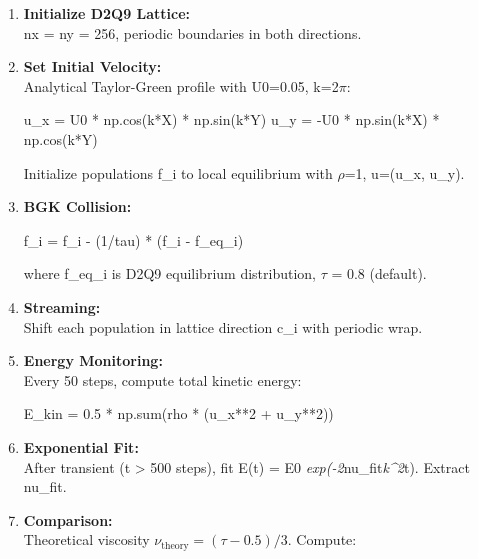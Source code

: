 \documentclass[
]{article}
\newenvironment{Shaded}{}{}
\newcommand{\BuiltInTok}[1]{\textcolor[rgb]{0.00,0.50,0.00}{#1}}
\newcommand{\DecValTok}[1]{\textcolor[rgb]{0.25,0.63,0.44}{#1}}
\newcommand{\FloatTok}[1]{\textcolor[rgb]{0.25,0.63,0.44}{#1}}
\newcommand{\NormalTok}[1]{#1}
\newcommand{\OperatorTok}[1]{\textcolor[rgb]{0.40,0.40,0.40}{#1}}
\begin{document}
\begin{enumerate}
\def\labelenumi{\arabic{enumi}.}
\item
  \textbf{Initialize D2Q9 Lattice:}\\
  nx = ny = 256, periodic boundaries in both directions.
\item
  \textbf{Set Initial Velocity:}\\
  Analytical Taylor-Green profile with U0=0.05, k=2$\pi$:

\begin{Shaded}
\begin{Highlighting}[]
\NormalTok{u\_x }\OperatorTok{=}\NormalTok{ U0 }\OperatorTok{*}\NormalTok{ np.cos(k}\OperatorTok{*}\NormalTok{X) }\OperatorTok{*}\NormalTok{ np.sin(k}\OperatorTok{*}\NormalTok{Y)}
\NormalTok{u\_y }\OperatorTok{=} \OperatorTok{{-}}\NormalTok{U0 }\OperatorTok{*}\NormalTok{ np.sin(k}\OperatorTok{*}\NormalTok{X) }\OperatorTok{*}\NormalTok{ np.cos(k}\OperatorTok{*}\NormalTok{Y)}
\end{Highlighting}
\end{Shaded}

  Initialize populations f\_i to local equilibrium with $\rho$=1, u=(u\_x,
  u\_y).
\item
  \textbf{BGK Collision:}

\begin{Shaded}
\begin{Highlighting}[]
\NormalTok{f\_i }\OperatorTok{=}\NormalTok{ f\_i }\OperatorTok{{-}}\NormalTok{ (}\DecValTok{1}\OperatorTok{/}\NormalTok{tau) }\OperatorTok{*}\NormalTok{ (f\_i }\OperatorTok{{-}}\NormalTok{ f\_eq\_i)}
\end{Highlighting}
\end{Shaded}

  where f\_eq\_i is D2Q9 equilibrium distribution, $\tau$ = 0.8 (default).
\item
  \textbf{Streaming:}\\
  Shift each population in lattice direction c\_i with periodic wrap.
\item
  \textbf{Energy Monitoring:}\\
  Every 50 steps, compute total kinetic energy:

\begin{Shaded}
\begin{Highlighting}[]
\NormalTok{E\_kin }\OperatorTok{=} \FloatTok{0.5} \OperatorTok{*}\NormalTok{ np.}\BuiltInTok{sum}\NormalTok{(rho }\OperatorTok{*}\NormalTok{ (u\_x}\OperatorTok{**}\DecValTok{2} \OperatorTok{+}\NormalTok{ u\_y}\OperatorTok{**}\DecValTok{2}\NormalTok{))}
\end{Highlighting}
\end{Shaded}
\item
  \textbf{Exponential Fit:}\\
  After transient (t \textgreater{} 500 steps), fit E(t) = E0
  \emph{exp(-2}nu\_fit\emph{k^{2}}t). Extract nu\_fit.
\item
  \textbf{Comparison:}\\
  Theoretical viscosity \(\nu_{\text{theory}} = (\tau - 0.5)/3\).
  Compute:


\end{enumerate}
\end{document}
